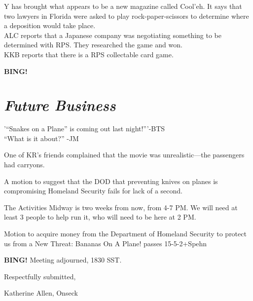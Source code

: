 \documentclass[10pt]{article}
\newcommand{\bing}{{\bf BING!} }
\newcommand{\goto}[1]{\bing \vskip 12pt \section*{{\em{#1}}}}
\begin{document}
Y has brought what appears to be a new magazine called Cool'eh.
It says that two lawyers in Florida were asked to play
rock-paper-scissors to determine where a deposition would take place.\\
ALC reports that a Japanese company was negotiating something to be
determined with RPS. They researched the game and won.\\
KKB reports that there is a RPS collectable card game.

\goto{Future Business}
'``Snakes on a Plane'' is coming out last night!'''-BTS\\
``What is it about?'' -JM

One of KR's friends complained that the movie was unrealistic---the
passengers had carryons.

A motion to suggest that the DOD that preventing knives on planes is compromising
Homeland Security fails for lack of a second.

The Activities Midway is two weeks from now, from 4-7 PM.  We will
need at least 3 people to help run it, who will need to be here at 2
PM.

Motion to acquire money from the Department of Homeland Security to
protect us from a New Threat: Bananas On A Plane! passes 15-5-2+Spehn

\bing
\noindent
Meeting adjourned, 1830 SST.

\vspace{18pt}

\centerline{Respectfully submitted,}
\centerline{Katherine Allen, Onseck}
\end{document}
